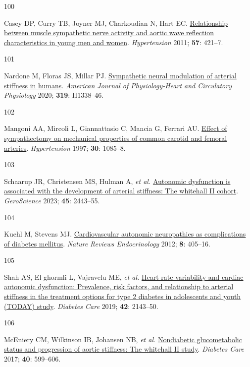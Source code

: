 \documentclass[
  a4paper,
  headsepline=true,
  open=any]{scrbook}
\newlength{\cslhangindent}
\newlength{\csllabelwidth}
\newlength{\cslentryspacingunit} %
\newenvironment{CSLReferences}[2] %
 {%
  \setlength{\parindent}{0pt}
  \ifodd #1
  \let\oldpar\par
  \def\par{\hangindent=\cslhangindent\oldpar}
  \fi
  \setlength{\parskip}{#2\cslentryspacingunit}
 }%
 {}
\newcommand{\CSLLeftMargin}[1]{\parbox[t]{\csllabelwidth}{#1}}
\newcommand{\CSLRightInline}[1]{\parbox[t]{\linewidth - \csllabelwidth}{#1}\break}
\begin{document}
\begin{CSLReferences}{0}{0}
\leavevmode{}%
\CSLLeftMargin{100 }%
\CSLRightInline{Casey DP, Curry TB, Joyner MJ, Charkoudian N, Hart EC.
\href{https://doi.org/10.1161/HYPERTENSIONAHA.110.164517}{Relationship
between muscle sympathetic nerve activity and aortic wave reflection
characteristics in young men and women}. \emph{Hypertension} 2011;
\textbf{57}: 421--7.}

\leavevmode{}%
\CSLLeftMargin{101 }%
\CSLRightInline{Nardone M, Floras JS, Millar PJ.
\href{https://doi.org/10.1152/ajpheart.00734.2020}{Sympathetic neural
modulation of arterial stiffness in humans}. \emph{American Journal of
Physiology-Heart and Circulatory Physiology} 2020; \textbf{319}:
H1338--46.}

\leavevmode{}%
\CSLLeftMargin{102 }%
\CSLRightInline{Mangoni AA, Mircoli L, Giannattasio C, Mancia G, Ferrari
AU. \href{https://doi.org/10.1161/01.HYP.30.5.1085}{Effect of
sympathectomy on mechanical properties of common carotid and femoral
arteries}. \emph{Hypertension} 1997; \textbf{30}: 1085--8.}

\leavevmode{}%
\CSLLeftMargin{103 }%
\CSLRightInline{Schaarup JR, Christensen MS, Hulman A, \emph{et al.}
\href{https://doi.org/10.1007/s11357-023-00762-0}{Autonomic dysfunction
is associated with the development of arterial stiffness: The whitehall
II cohort}. \emph{GeroScience} 2023; \textbf{45}: 2443--55.}

\leavevmode{}%
\CSLLeftMargin{104 }%
\CSLRightInline{Kuehl M, Stevens MJ.
\href{https://doi.org/10.1038/nrendo.2012.21}{Cardiovascular autonomic
neuropathies as complications of diabetes mellitus}. \emph{Nature
Reviews Endocrinology} 2012; \textbf{8}: 405--16.}

\leavevmode{}%
\CSLLeftMargin{105 }%
\CSLRightInline{Shah AS, El ghormli L, Vajravelu ME, \emph{et al.}
\href{https://doi.org/10.2337/dc19-0993}{Heart rate variability and
cardiac autonomic dysfunction: Prevalence, risk factors, and
relationship to arterial stiffness in the treatment options for type 2
diabetes in adolescents and youth (TODAY) study}. \emph{Diabetes Care}
2019; \textbf{42}: 2143--50.}

\leavevmode{}%
\CSLLeftMargin{106 }%
\CSLRightInline{McEniery CM, Wilkinson IB, Johansen NB, \emph{et al.}
\href{https://doi.org/10.2337/dc16-1773}{Nondiabetic glucometabolic
status and progression of aortic stiffness: The whitehall II study}.
\emph{Diabetes Care} 2017; \textbf{40}: 599--606.}


\end{CSLReferences}
\end{document}
